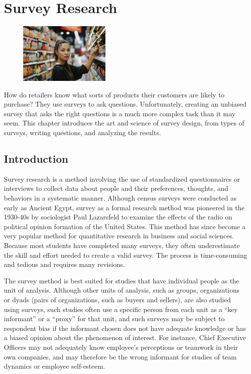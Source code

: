 \chapter{Survey Research}\label{08:surveys}

\begin{figure}
	\label{08:fig01} 
	\centering
	\includegraphics[width=0.4\textwidth]{gfx/08-01} 
\end{figure}

How do retailers know what sorts of products their customers are likely to purchase? They use surveys to ask questions. Unfortunately, creating an unbiased survey that asks the right questions is a much more complex task than it may seem. This chapter introduces the art and science of survey design, from types of surveys, writing questions, and analyzing the results.

\section{Introduction}

Survey research is a method involving the use of standardized questionnaires or interviews to collect data about people and their preferences, thoughts, and behaviors in a systematic manner. Although census surveys were conducted as early as Ancient Egypt, survey as a formal research method was pioneered in the 1930-40s by sociologist Paul Lazarsfeld to examine the effects of the radio on political opinion formation of the United States. This method has since become a very popular method for quantitative research in business and social sciences. Because most students have completed many surveys, they often underestimate the skill and effort needed to create a valid survey. The process is time-consuming and tedious and requires many revisions.

The survey method is best suited for studies that have individual people as the unit of analysis. Although other units of analysis, such as groups, organizations or dyads (pairs of organizations, such as buyers and sellers), are also studied using surveys, such studies often use a specific person from each unit as a ``key informant'' or a ``proxy'' for that unit, and such surveys may be subject to respondent bias if the informant chosen does not have adequate knowledge or has a biased opinion about the phenomenon of interest. For instance, Chief Executive Officers may not adequately know employee's perceptions or teamwork in their own companies, and may therefore be the wrong informant for studies of team dynamics or employee self-esteem.

